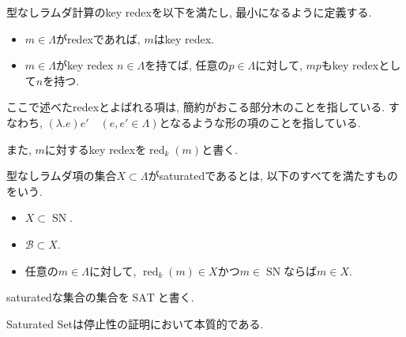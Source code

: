 \documentclass[12pt, titlepage]{ltjsarticle}
\DeclareMathOperator{\SN}{SN}
\DeclareMathOperator{\SAT}{SAT}
\DeclareMathOperator{\red}{red}
\begin{document}
\begin{defn}
 型なしラムダ計算のkey redexを以下を満たし, 最小になるように定義する.
 \begin{itemize}
  \item $m \in \Lambda$がredexであれば, $m$はkey redex.
  \item $m \in \Lambda$がkey redex $n \in \Lambda$を持てば, 任意の$p \in \Lambda$に対して, $m p$もkey redexとして$n$を持つ.
 \end{itemize}
ここで述べたredexとよばれる項は, 簡約がおこる部分木のことを指している. すなわち, $(\lambda. e) e' \quad (e, e' \in \Lambda)$となるような形の項のことを指している.

また, $m$に対するkey redexを$\red_k(m)$と書く.
\end{defn}

\begin{defn}\label{ss}
 型なしラムダ項の集合$X \subset \Lambda$がsaturatedであるとは, 以下のすべてを満たすものをいう.
 \begin{itemize}
  \item $X \subset \SN$.
  \item $\mathcal{B} \subset X$.
  \item 任意の$m \in \Lambda$に対して, $\red_k(m) \in X$かつ$m \in \SN$ならば$m \in X$.
 \end{itemize}
 saturatedな集合の集合を$\SAT$と書く.
\end{defn}

\begin{rem}
 Saturated Setは停止性の証明において本質的である.
\end{rem}
\end{document}
